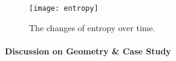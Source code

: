 \begin{figure}
\centering
    \texttt{[image: entropy]}
    \vspace{-0.1in}
     \caption{The changes of entropy over time.}
    \label{Fig-entropy}
\end{figure}






\paragraph{Discussion on Geometry \& Case Study}






